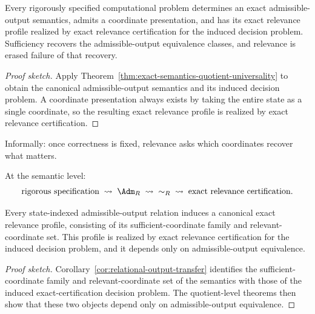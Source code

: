\begin{corollary}\label{cor:universal-scope-rigorously-specified-problems}
Every rigorously specified computational problem determines an exact admissible-output semantics, admits a coordinate presentation, and has its exact relevance profile realized by exact relevance certification for the induced decision problem. Sufficiency recovers the admissible-output equivalence classes, and relevance is erased failure of that recovery.
\end{corollary}

\begin{proof}[Proof sketch]
Apply Theorem~\ref{thm:exact-semantics-quotient-universality} to obtain the canonical admissible-output semantics and its induced decision problem. A coordinate presentation always exists by taking the entire state as a single coordinate, so the resulting exact relevance profile is realized by exact relevance certification.
\end{proof}

\par\medskip
\noindent
Informally: once correctness is fixed, relevance asks which coordinates recover what matters.
\par\medskip

At the semantic level:
\[
\text{rigorous specification}
\;\rightsquigarrow\;
\Adm_R
\;\rightsquigarrow\;
{\sim_R}
\;\rightsquigarrow\;
\text{exact relevance certification}.
\]

\begin{proposition}\label{prop:canonical-exact-relevance-profile}
Every state-indexed admissible-output relation induces a canonical exact relevance profile, consisting of its sufficient-coordinate family and relevant-coordinate set. This profile is realized by exact relevance certification for the induced decision problem, and it depends only on admissible-output equivalence.
\end{proposition}

\begin{proof}[Proof sketch]
Corollary~\ref{cor:relational-output-transfer} identifies the sufficient-coordinate family and relevant-coordinate set of the semantics with those of the induced exact-certification decision problem. The quotient-level theorems then show that these two objects depend only on admissible-output equivalence.
\end{proof}


